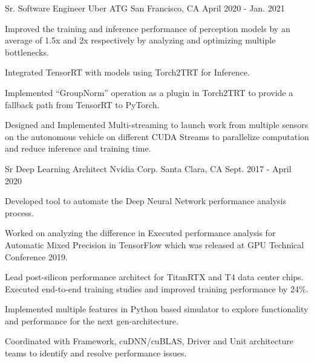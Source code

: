 \begin{cventries}
  \cventry
    {Sr. Software Engineer} %
    {Uber ATG} %
    {San Francisco, CA} %
    {April 2020 - Jan. 2021} %
    {
      \begin{cvitems} %
        \item {Improved the training and inference performance of perception models by an average of 1.5x and 2x respectively by analyzing and optimizing multiple bottlenecks.}
        \item {Integrated TensorRT with models using Torch2TRT for Inference.}
        \item {Implemented “GroupNorm” operation as a plugin in Torch2TRT to provide a fallback path from TensorRT to PyTorch.}
        \item {Designed and Implemented Multi-streaming to launch work from multiple sensors on the autonomous vehicle on different CUDA Streams to parallelize computation and reduce inference and training time.}
      \end{cvitems}
    }

  \cventry
    {Sr Deep Learning Architect} %
    {Nvidia Corp.} %
    {Santa Clara, CA} %
    {Sept. 2017 - April 2020} %
    {
      \begin{cvitems} %
        \item {Developed tool to automate the Deep Neural Network performance analysis process.}
        \item {Worked on analyzing the difference in Executed performance analysis for Automatic Mixed Precision in TensorFlow which was released at GPU Technical Conference 2019.}
        \item {Lead post-silicon performance architect for TitanRTX and T4 data center chips. Executed end-to-end training studies and improved training performance by 24\%.}
        \item {Implemented multiple features in Python based simulator to explore functionality and performance for the next gen-architecture.}
        \item {Coordinated with Framework, cuDNN/cuBLAS, Driver and Unit architecture teams to identify and resolve performance issues.}
      \end{cvitems}
    }


\end{cventries}
